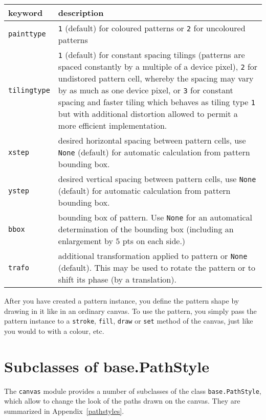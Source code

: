 \medskip
\begin{tabularx}{\linewidth}{l>{\raggedright\arraybackslash}X}
keyword&description\\
\hline
\texttt{painttype}&\texttt{1} (default) for coloured patterns or
\texttt{2} for uncoloured patterns\\
\texttt{tilingtype}&\texttt{1} (default) for constant spacing tilings
(patterns are spaced constantly by a multiple of a device pixel),
\texttt{2} for undistored pattern cell, whereby the spacing may vary
by as much as one device pixel, or \texttt{3} for constant spacing and
faster tiling which behaves as tiling type \texttt{1} but with
additional distortion allowed to permit a more efficient
implementation.\\
\texttt{xstep}&desired horizontal spacing between pattern cells, use
\texttt{None} (default) for automatic calculation from pattern
bounding box.\\
\texttt{ystep}&desired vertical spacing between pattern cells, use
\texttt{None} (default) for automatic calculation from pattern
bounding box.\\
\texttt{bbox}&bounding box of pattern. Use \texttt{None} for an
automatical determination of the bounding box (including an
enlargement by $5$ pts on each side.)\\
\texttt{trafo}&additional transformation applied to pattern or
\texttt{None} (default). This may be used to rotate the pattern or to
shift its phase (by a translation).
\end{tabularx}
\medskip

After you have created a pattern instance, you define the pattern
shape by drawing in it like in an ordinary canvas. To use the pattern,
you simply pass the pattern instance to a \texttt{stroke},
\texttt{fill}, \texttt{draw} or \texttt{set} method of the canvas,
just like you would to with a colour, etc.



\section{Subclasses of base.PathStyle}

The \verb|canvas| module provides a number of subclasses of the class
\verb|base.PathStyle|, which allow to change the look of the paths
drawn on the canvas. They are summarized in Appendix~\ref{pathstyles}.





